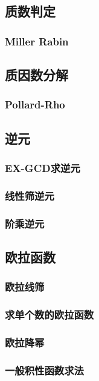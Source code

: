\documentclass[twocolumn,a4]{article}
\newcommand{\addcpp}[1]{}
\begin{document}
	\subsection{质数判定}
		\subsubsection{Miller Rabin}
			\addcpp{math/Miller-Rabin}
	\subsection{质因数分解}
		\subsubsection{Pollard-Rho}
			\addcpp{math/Pollard-rho}
	\subsection{逆元}
		\subsubsection{EX-GCD求逆元}
			\addcpp{math/EXGCD_INV}
		\subsubsection{线性筛逆元}
		\subsubsection{阶乘逆元}
	\subsection{欧拉函数}
		\subsubsection{欧拉线筛}
		\subsubsection{求单个数的欧拉函数}
		\subsubsection{欧拉降幂}
			\addcpp{math/EXEuler}
		\subsubsection{一般积性函数求法}
\end{document}
